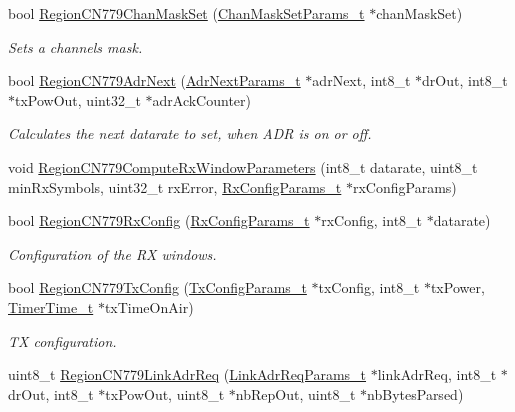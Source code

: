 \begin{DoxyCompactItemize}
bool \hyperlink{group__REGIONCN779_ga06c5fe5ebbc02741394fb573944467b7}{Region\+C\+N779\+Chan\+Mask\+Set} (\hyperlink{group__REGION_ga6d24f7da136006410827dfb29f6b9b9e}{Chan\+Mask\+Set\+Params\+\_\+t} $\ast$chan\+Mask\+Set)
\begin{DoxyCompactList}\small\item\em Sets a channels mask. \end{DoxyCompactList}\item 
bool \hyperlink{group__REGIONCN779_ga4c114db1d998a5ba77bb87ab34316ff8}{Region\+C\+N779\+Adr\+Next} (\hyperlink{group__REGION_ga567c2742622326b350b4e91bbf61b4ce}{Adr\+Next\+Params\+\_\+t} $\ast$adr\+Next, int8\+\_\+t $\ast$dr\+Out, int8\+\_\+t $\ast$tx\+Pow\+Out, uint32\+\_\+t $\ast$adr\+Ack\+Counter)
\begin{DoxyCompactList}\small\item\em Calculates the next datarate to set, when A\+DR is on or off. \end{DoxyCompactList}\item 
void \hyperlink{group__REGIONCN779_ga4f354a88e5bfee44eccaad7d2e18c87e}{Region\+C\+N779\+Compute\+Rx\+Window\+Parameters} (int8\+\_\+t datarate, uint8\+\_\+t min\+Rx\+Symbols, uint32\+\_\+t rx\+Error, \hyperlink{group__REGION_ga375c038078dfcfc7ef14280021db719e}{Rx\+Config\+Params\+\_\+t} $\ast$rx\+Config\+Params)
\item 
bool \hyperlink{group__REGIONCN779_ga89b2db72c7dd1dbaa07135d538e3c2fe}{Region\+C\+N779\+Rx\+Config} (\hyperlink{group__REGION_ga375c038078dfcfc7ef14280021db719e}{Rx\+Config\+Params\+\_\+t} $\ast$rx\+Config, int8\+\_\+t $\ast$datarate)
\begin{DoxyCompactList}\small\item\em Configuration of the RX windows. \end{DoxyCompactList}\item 
bool \hyperlink{group__REGIONCN779_gae628efcfcba9afc2620f3c1234b90c3d}{Region\+C\+N779\+Tx\+Config} (\hyperlink{group__REGION_gabed730d4d04b0b60d4b6d1966d3f21d3}{Tx\+Config\+Params\+\_\+t} $\ast$tx\+Config, int8\+\_\+t $\ast$tx\+Power, \hyperlink{utilities_8h_a4215ca43d3e953099ea758ce428599d0}{Timer\+Time\+\_\+t} $\ast$tx\+Time\+On\+Air)
\begin{DoxyCompactList}\small\item\em TX configuration. \end{DoxyCompactList}\item 
uint8\+\_\+t \hyperlink{group__REGIONCN779_gae3bdb6e223de1fd6b72182eb278f3828}{Region\+C\+N779\+Link\+Adr\+Req} (\hyperlink{group__REGION_gad4af503e8d4de1846129e26a799a1e8e}{Link\+Adr\+Req\+Params\+\_\+t} $\ast$link\+Adr\+Req, int8\+\_\+t $\ast$dr\+Out, int8\+\_\+t $\ast$tx\+Pow\+Out, uint8\+\_\+t $\ast$nb\+Rep\+Out, uint8\+\_\+t $\ast$nb\+Bytes\+Parsed)

\end{DoxyCompactItemize}

